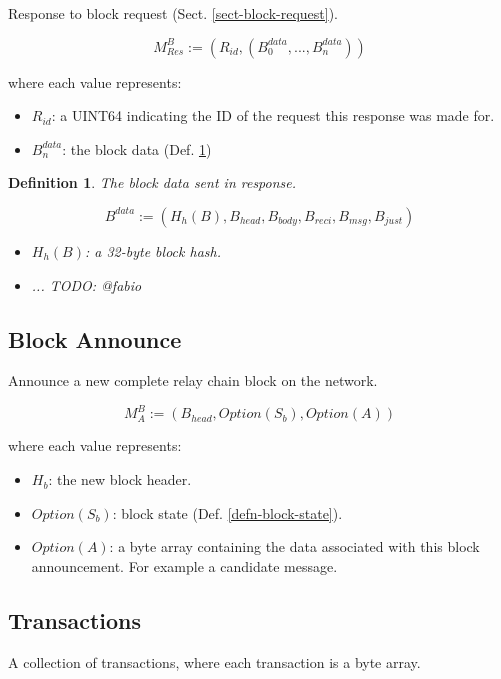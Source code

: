\documentclass{book}
\newtheorem{definition}{Definition}
\newcommand{\todo}[1]{}
\renewcommand{\todo}[1]{{\color{red} TODO: {#1}}}
\begin{document}
Response to block request (Sect. \ref{sect-block-request}).

\[
    M^B_{Res} := (R_{id}, (B^{data}_0, ..., B^{data}_n))
\]

where each value represents:

\begin{itemize}
    \item $R_{id}$: a UINT64 indicating the ID of the request this response was
    made for.
    \item $B^{data}_n$: the block data (Def. \ref{defn-block-data})
\end{itemize}

\begin{definition}
    \label{defn-block-data}
    The block data sent in response.

    \[
        B^{data} := (H_h(B), B_{head}, B_{body}, B_{reci}, B_{msg}, B_{just})
    \]

    \begin{itemize}
        \item $H_h(B)$: a 32-byte block hash.
        \item ... \todo{@fabio}
    \end{itemize}
\end{definition}

\subsection{Block Announce}

Announce a new complete relay chain block on the network.

\[
    M^B_A := (B_{head}, Option(S_b), Option(A))
\]

where each value represents:

\begin{itemize}
    \item $H_b$: the new block header.
    \item $Option(S_b)$: block state (Def. \ref{defn-block-state}).
    \item $Option(A)$: a byte array containing the data associated with this
    block announcement. For example a candidate message.
\end{itemize}

\subsection{Transactions}

A collection of transactions, where each transaction is a byte array.
\end{document}
